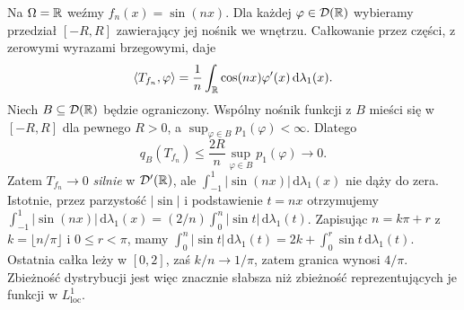 \begin{przyklad}
\label{ex:oscillations19}
Na $\Omega=\mathbb R$ weźmy $f_n(x)=\sin(nx)$.
Dla każdej $\varphi\in\mathcal D(\mathbb R)$ wybieramy przedział
$[-R,R]$ zawierający jej nośnik we wnętrzu.
Całkowanie przez części, z zerowymi wyrazami brzegowymi,
daje
\[\langle T_{f_n},\varphi\rangle=
\frac1n\int_\mathbb R\cos(nx)\varphi'(x)\,
\mathrm d\lambda_1(x).\]
Niech $B\subseteq\mathcal D(\mathbb R)$ będzie ograniczony.
Wspólny nośnik funkcji z $B$ mieści się w $[-R,R]$
dla pewnego $R>0$, a $\sup_{\varphi\in B}p_1(\varphi)<\infty$.
Dlatego
\[q_B(T_{f_n})\le\frac{2R}{n}
\sup_{\varphi\in B}p_1(\varphi)\longrightarrow0.\]
Zatem $T_{f_n}\to0$ \emph{silnie} w $\mathcal D'(\mathbb R)$,
ale $\int_{-1}^1|\sin(nx)|\,\mathrm d\lambda_1(x)$
nie dąży do zera. Istotnie, przez parzystość $|\sin|$
i podstawienie $t=nx$ otrzymujemy
$\int_{-1}^1|\sin(nx)|\,\mathrm d\lambda_1(x)
=(2/n)\int_0^n|\sin t|\,\mathrm d\lambda_1(t)$.
Zapisując $n=k\pi+r$ z $k=\lfloor n/\pi\rfloor$ i $0\le r<\pi$,
mamy $\int_0^n|\sin t|\,\mathrm d\lambda_1(t)=2k+\int_0^r\sin t\,\mathrm d\lambda_1(t)$.
Ostatnia całka leży w $[0,2]$, zaś $k/n\to1/\pi$,
zatem granica wynosi $4/\pi$.
Zbieżność dystrybucji jest więc znacznie słabsza niż
zbieżność reprezentujących je funkcji w $L^1_{\mathrm{loc}}$.
\end{przyklad}

